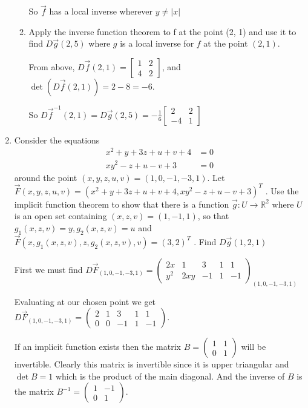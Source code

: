 \documentclass{article}
\begin{document}
\begin{enumerate}
\begin{enumerate}[label= (\alph*)]
So $\vec f$ has a local inverse wherever $y\neq |x|$

\item Apply the inverse function theorem to f at the point (2, 1) and use it
to find $D\vec g(2, 5)$ where $g$ is a local inverse for $f$ at the point $(2, 1)$.

From above, $D\vec f(2,1) =\begin{bmatrix} 
1&2\\
4&2
\end{bmatrix}$, and $\det(D\vec f(2,1))=2-8=-6$.

So $D\vec f^{-1}(2,1)=D\vec g(2,5)=-\frac{1}{6}\begin{bmatrix} 2&2\\-4&1 \end{bmatrix}$

\end{enumerate}
\item Consider the equations
\begin{align*} x^2 + y + 3z + u + v + 4 &= 0\\
xy^2 - z + u - v + 3 &= 0
\end{align*}
around the point $(x, y, z, u, v) = (1, 0 ,- 1, -3, 1)$.
Let $\vec F (x, y, z, u, v) = (x^2 + y + 3z + u + v + 4, xy^2 - z + u - v + 3)^T$ .
Use the implicit function theorem to show that there is a function $\vec g : U \to\mathbb{R}^2$ where
$U$ is an open set containing $(x, z, v) = (1, -1, 1)$, so that $g_1(x, z, v) = y, g_2(x, z, v) = u$
and $\vec F (x, g_1(x, z, v), z, g_2(x, z, v), v) = (3, 2)^T$ . Find $D\vec g(1, 2, 1)$


First we must find $D\vec F_{(1,0,-1,-3,1)}= \begin{pmatrix}2x&1&3&1&1\\y^2&2xy&-1&1&-1\end{pmatrix}_{(1,0,-1,-3,1)}$

Evaluating at our chosen point we get $D\vec F_{(1,0,-1,-3,1)}= \begin{pmatrix}2 &1&3&1&1\\0&0&-1&1&-1\end{pmatrix}$.

If an implicit function exists then the matrix $B=\begin{pmatrix}1&1\\0&1\end{pmatrix}$ will be invertible. Clearly this matrix is invertible since it is upper triangular and $\det B=1$ which is the product of the main diagonal. And the inverse of $B$ is the matrix $B^{-1}=\begin{pmatrix}1&-1\\0&1\end{pmatrix}$.


\end{enumerate}
\end{document}
